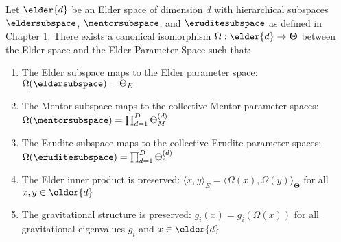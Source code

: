 \begin{theorem}
\label{thm:elder_parameter_isomorphism}
Let $\elder{d}$ be an Elder space of dimension $d$ with hierarchical subspaces $\eldersubspace$, $\mentorsubspace$, and $\eruditesubspace$ as defined in Chapter 1. There exists a canonical isomorphism $\Omega: \elder{d} \rightarrow \boldsymbol{\Theta}$ between the Elder space and the Elder Parameter Space such that:

\begin{enumerate}
    \item The Elder subspace maps to the Elder parameter space: $\Omega(\eldersubspace) = \Theta_E$
    
    \item The Mentor subspace maps to the collective Mentor parameter spaces: $\Omega(\mentorsubspace) = \prod_{d=1}^D \Theta_M^{(d)}$
    
    \item The Erudite subspace maps to the collective Erudite parameter spaces: $\Omega(\eruditesubspace) = \prod_{d=1}^D \Theta_e^{(d)}$
    
    \item The Elder inner product is preserved: $\langle x, y \rangle_E = \langle \Omega(x), \Omega(y) \rangle_{\boldsymbol{\Theta}}$ for all $x, y \in \elder{d}$
    
    \item The gravitational structure is preserved: $g_i(x) = g_i(\Omega(x))$ for all gravitational eigenvalues $g_i$ and $x \in \elder{d}$
\end{enumerate}
\end{theorem}


